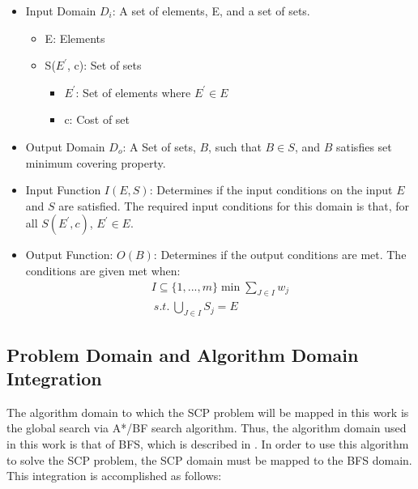 \documentclass[12pt]{article}
\begin{document}
	\begin{itemize}
		\item Input Domain $D_i$: A set of elements, E, and a set of sets. 
		\begin{itemize}
			\item E: Elements
			\item S($E^\prime$, c): Set of sets
			\begin{itemize}
				\item $E^\prime$: Set of elements where $E^\prime \in E$
				\item c: Cost of set
			\end{itemize}
		\end{itemize}	
		\item Output Domain $D_o$: A Set of sets, $B$, such that $B \in S$, and $B$ satisfies set minimum covering property. 
		
		\item Input Function $I(E, S)$: Determines if the input conditions on the input $E$ and $S$ are satisfied. The required input conditions for this domain is that, for all $S(E^\prime, c)$, $E^\prime \in E$.
		\item Output Function: $O(B)$: Determines if the output conditions are met. The conditions are given met when:
		\begin{align*}
		I \subseteq \{1,...,m\} \min \sum_{J \in I} w_j \\
		\:s.t.\: \bigcup_{J \in I} S_j = E
		\end{align*}
		
	\end{itemize}
	
	\subsection{Problem Domain and Algorithm Domain Integration}
	
	The algorithm domain to which the SCP problem will be mapped in this work is the global search via A*/BF search algorithm. Thus, the algorithm domain used in this work is that of BFS, which is described in \cite{ClassNotes686}. In order to use this algorithm to solve the SCP problem, the SCP domain must be mapped to the BFS domain. This integration is accomplished as follows:
	
\end{document}

